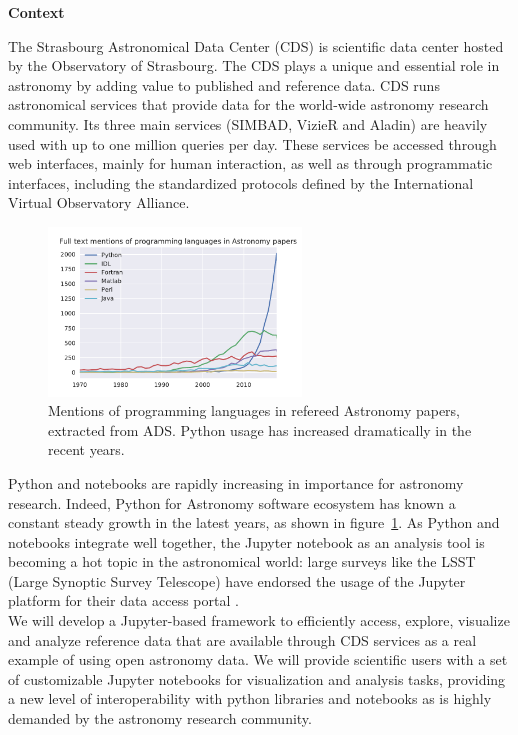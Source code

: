 \begin{task}[
  title=Astronomy application,
  id=astro,
  lead=CDS,
  PM=20,
  wphases={18-42},
  partners={EGI,INSERM,QS,SRL,WTT,XFEL}
]

\textbf{Context}

  The Strasbourg Astronomical Data Center (CDS) is scientific data
  center hosted by the Observatory of Strasbourg. The CDS plays a unique and
  essential role in astronomy by adding value to published and reference data.
  CDS runs astronomical services that
  provide data for the world-wide astronomy research community. Its three main
  services (SIMBAD, VizieR and Aladin) are heavily used with up to one million
  queries per day.  These services be accessed through web interfaces, mainly
  for human interaction, as well as through programmatic interfaces, including
  the standardized protocols defined by the International Virtual Observatory
  Alliance.

\begin{figure}[ht!]\centering
  \includegraphics[width=0.6\textwidth]{python-astro-citations}
  \caption{Mentions of programming languages in refereed Astronomy papers, extracted from ADS. Python usage has increased dramatically in the recent years.}\label{fig:python-astro-citations}
\end{figure}

  Python and notebooks are rapidly increasing in importance for astronomy
  research. Indeed, Python for Astronomy software ecosystem has known a
  constant steady growth in the latest years, as shown in
  figure~\ref{fig:python-astro-citations}. As Python and notebooks integrate
  well together, the Jupyter notebook as an analysis tool is becoming a hot
  topic in the astronomical world: large surveys like the LSST (Large Synoptic
  Survey Telescope) have endorsed the usage of the Jupyter platform for their
    data access portal \cite{lsst2017scienceplatform}.\\


  We will develop a Jupyter-based framework to efficiently access, explore,
  visualize and analyze reference data that are available through CDS services
  as a real example of using open astronomy data.
  We will provide scientific users with a set of customizable Jupyter notebooks
  for visualization and analysis tasks, providing a new level of
  interoperability with python libraries and notebooks as is highly demanded
  by the astronomy research community.


\end{task}
